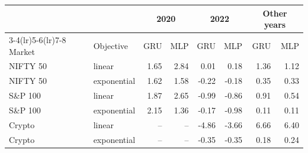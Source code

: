 \begin{tabular}{llrrrrrr}
\toprule
& & \multicolumn{2}{c}{2020} & \multicolumn{2}{c}{2022} & \multicolumn{2}{c}{Other years} \\
\cmidrule(lr){3-4}\cmidrule(lr){5-6}\cmidrule(lr){7-8}
Market & Objective & GRU & MLP & GRU & MLP & GRU & MLP \\
\midrule
NIFTY 50 & linear & 1.65 & 2.84 & 0.01 & 0.18 & 1.36 & 1.12 \\
NIFTY 50 & exponential & 1.62 & 1.58 & -0.22 & -0.18 & 0.35 & 0.33 \\
S\&P 100 & linear & 1.87 & 2.65 & -0.99 & -0.86 & 0.91 & 0.54 \\
S\&P 100 & exponential & 2.15 & 1.36 & -0.17 & -0.98 & 0.11 & 0.11 \\
Crypto & linear & -- & -- & -4.86 & -3.66 & 6.66 & 6.40 \\
Crypto & exponential & -- & -- & -0.35 & -0.35 & 0.18 & 0.24 \\
\bottomrule
\end{tabular}
